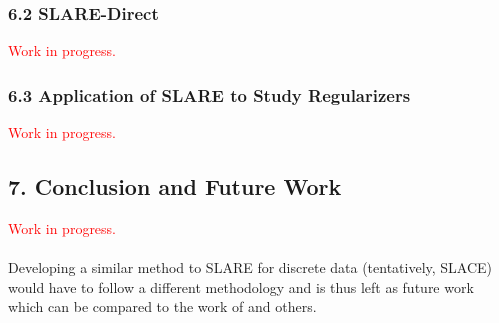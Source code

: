 \documentclass{NSF}
\begin{document}
\subsubsection{6.2 SLARE-Direct}

\textcolor{red}{Work in progress.}

\subsubsection{6.3 Application of SLARE to Study Regularizers}

\textcolor{red}{Work in progress.}

\subsection{7. Conclusion and Future Work}

\textcolor{red}{Work in progress.}
\\
\\
Developing a similar method to SLARE for discrete data (tentatively, SLACE) would have to follow a different methodology and is thus left as future work which can be compared to the work of \cite{zhang2016understanding} and others.

\newpage
\renewcommand\refname{References}


\end{document}
